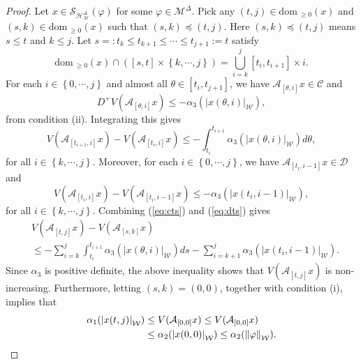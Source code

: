 \documentclass[journal,final,twocolumn]{IEEEtran}
\theoremstyle{definition}
\begin{document}
\begin{proof}
Let $x\in{\mathcal{S}_{\mathcal{H}_\mathcal{M}^{\Delta}}}({\varphi})$ for some ${\varphi}\in{\mathcal{M}^{\Delta}}$. Pick any $(t,j)\in{\text{dom}\,}_{\ge 0} (x)$ and $(s,k)\in{\text{dom}\,}_{\ge 0} (x)$ such that $(s,k)\preceq(t,j)$. Here $(s,k)\preceq(t,j)$ means $s\leq t$ and $k\leq j$. Let $s=:t_k\le t_{k+1}\le \cdots\le t_{j+1}:=t$ satisfy
$$
{\text{dom}\,}_{\ge 0} (x)\cap ([s,t]\times{\left\{{k,\cdots,j}\right\}})= \bigcup_{i=k}^j[t_i,t_{i+1}]\times{i}.
$$
For each $i\in{\left\{{0,\cdots,j}\right\}}$ and almost all $\theta\in[t_i,t_{j+1}]$, we have ${\mathcal{A}}_{[\theta,i]}x\in{\mathcal{C}}$ and
$$
D^+V({\mathcal{A}}_{[\theta,i]}x)\le -\alpha_3({\left\vert{x(\theta,i)}\right\vert}_{\mathcal{W}}),
$$
from condition (ii). Integrating this gives
\begin{equation}\label{eq:cts}
V({\mathcal{A}}_{[t_{i+1},i]}x)-V({\mathcal{A}}_{[t_{i},i]}x)\le -\int_{t_{i}}^{t_{i+1}}\alpha_3({\left\vert{x(\theta,i)}\right\vert}_{\mathcal{W}})d\theta,
\end{equation}
for all $i\in{\left\{{k,\cdots,j}\right\}}$. Moreover, for each $i\in{\left\{{0,\cdots,j}\right\}}$, we have ${\mathcal{A}}_{[t_i,i-1]}x\in{\mathcal{D}}$ and
\begin{equation}\label{eq:dts}
V({\mathcal{A}}_{[t_{i},i]}x)-V({\mathcal{A}}_{[t_{i},i-1]}x)\le -\alpha_3({\left\vert{x(t_i,i-1)}\right\vert}_{\mathcal{W}}),
\end{equation}
for all $i\in{\left\{{k,\cdots,j}\right\}}$. Combining (\ref{eq:cts}) and (\ref{eq:dts}) gives
\begin{align*}
&V({\mathcal{A}}_{[t,j]}x)-V({\mathcal{A}}_{[s,k]}x)\\
&\le -\sum_{i=k}^j\int_{t_i}^{t_{i+1}}\alpha_3({\left\vert{x(\theta,i)}\right\vert}_{\mathcal{W}})ds-\sum_{i=k+1}^j\alpha_3({\left\vert{x(t_i,i-1)}\right\vert}_{\mathcal{W}}).
\end{align*}
Since $\alpha_3$ is positive definite, the above inequality shows that $V({\mathcal{A}}_{[t,j]}x)$ is non-increasing. Furthermore, letting $(s,k)=(0,0)$, together with condition (i), implies that
\begin{align}\label{eq:uniform}
\alpha_1({\left\vert{x(t,j)}\right\vert}_{\mathcal{W}})&\le V({\mathcal{A}}_{[0,0]}x)\le V({\mathcal{A}}_{[0,0]}x)\notag\\
&\le\alpha_2({\left\vert{x(0,0)}\right\vert}_{\mathcal{W}})\le\alpha_2({\Vert{\varphi}\Vert}_{\mathcal{W}}).
\end{align}


\end{proof}
\end{document}
